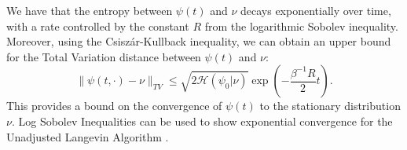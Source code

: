 \documentclass[11pt, twoside]{report}
\begin{document}

We have that the entropy between $\psi(t)$ and $\nu$ decays exponentially over time, with a rate controlled by the constant $R$ from the logarithmic Sobolev inequality. Moreover, using the Csisz\'{a}r-Kullback inequality, we can obtain an upper bound for the Total Variation distance between $\psi(t)$ and $\nu$:
\[
\|\psi(t, \cdot) - \nu\|_{TV} \leq \sqrt{2\mathcal{H}(\psi_0 | \nu)} \exp\left(-\frac{\beta^{-1}R}{2} t\right).
\]
This provides a bound on the convergence of $\psi(t)$ to the stationary distribution $\nu$. Log Sobolev Inequalities can be used to show exponential convergence for the Unadjusted Langevin Algorithm \cite{Vempala2019}. 
\end{document}
